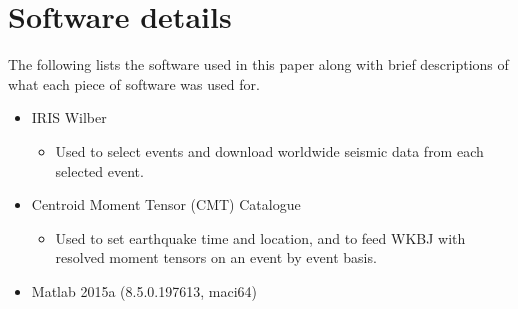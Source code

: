 \documentclass[11pt,a4paper]{article}
\begin{document}
\appendix
\section{Software details}
\label{app:Software}
The following lists the software used in this paper along with brief descriptions of what each piece of software was used for.
\begin{itemize}
	\item IRIS Wilber
	\begin{itemize}
		\item Used to select events and download worldwide seismic data from each selected event.
	\end{itemize}
	\item Centroid Moment Tensor (CMT) Catalogue
	\begin{itemize}
		\item Used to set earthquake time and location, and to feed WKBJ with resolved moment tensors on an event by event basis.
	\end{itemize}
	\item Matlab 2015a (8.5.0.197613, maci64)
\end{itemize}

\newpage


\end{document}
